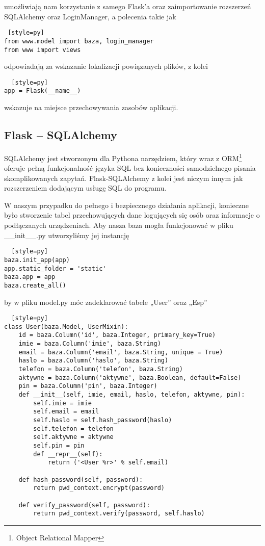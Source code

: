 \documentclass{xmgr}
\begin{document}
umożliwiają nam korzystanie z samego Flask’a oraz zaimportowanie rozszerzeń SQLAlchemy oraz LoginManager, a polecenia takie jak 
\begin{lstlisting} [style=py] 
from www.model import baza, login_manager  
from www import views
\end{lstlisting}
odpowiadają za wskazanie lokalizacji powiązanych plików, z kolei 
\begin{lstlisting}  [style=py] 
app = Flask(__name__)
\end{lstlisting}
wskazuje na miejsce przechowywania zasobów aplikacji. 

\subsection{Flask -- SQLAlchemy}

SQLAlchemy jest stworzonym dla Pythona narzędziem,  który wraz z ORM\footnote{Object Relational Mapper} oferuje pełną funkcjonalność języka SQL bez konieczności samodzielnego pisania skomplikowanych zapytań. Flask-SQLAlchemy z kolei jest niczym innym jak rozszerzeniem dodającym usługę SQL do programu. 

W naszym przypadku do pełnego i bezpiecznego działania aplikacji, konieczne było stworzenie tabel przechowujących dane logujących się osób oraz informacje o podłączanych urządzeniach.
Aby nasza baza mogła funkcjonować w pliku \_\_init\_\_.py utworzyliśmy jej instancję 

\begin{lstlisting}  [style=py] 
baza.init_app(app)
app.static_folder = 'static'
baza.app = app
baza.create_all()
\end{lstlisting}

by w pliku model.py móc zadeklarować tabele „User” oraz „Esp”

\label{Model}
\begin{lstlisting}  [style=py] 
class User(baza.Model, UserMixin):
    id = baza.Column('id', baza.Integer, primary_key=True)
    imie = baza.Column('imie', baza.String)
    email = baza.Column('email', baza.String, unique = True)
    haslo = baza.Column('haslo', baza.String)
    telefon = baza.Column('telefon', baza.String)
    aktywne = baza.Column('aktywne', baza.Boolean, default=False)
    pin = baza.Column('pin', baza.Integer)
    def __init__(self, imie, email, haslo, telefon, aktywne, pin):
        self.imie = imie
        self.email = email
        self.haslo = self.hash_password(haslo)
        self.telefon = telefon
        self.aktywne = aktywne
        self.pin = pin
        def __repr__(self):
            return ('<User %r>' % self.email)
    
    def hash_password(self, password):
        return pwd_context.encrypt(password)
    
    def verify_password(self, password):
        return pwd_context.verify(password, self.haslo)
\end{lstlisting}
\end{document}
